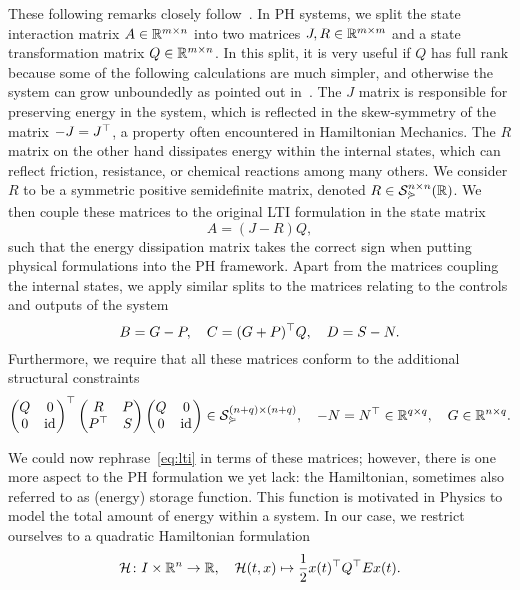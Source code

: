 These following remarks closely follow~\cite[Definition~4.9]{Mehrmann2023}.
In \ac{PH} systems, we split the state interaction matrix $A \in \mathbb{R}^{m \times n}$ into two matrices $J, R \in \mathbb{R}^{m \times m}$ and a state transformation matrix $Q \in \mathbb{R}^{m \times n}$.
In this split, it is very useful if $Q$ has full rank because some of the following calculations are much simpler, and otherwise the system can grow unboundedly as pointed out in~\cite[Remark~4.10]{Mehrmann2023}.
The $J$ matrix is responsible for preserving energy in the system, which is reflected in the skew-symmetry of the matrix $-J = J^{\top}$, a property often encountered in Hamiltonian Mechanics.
The $R$ matrix on the other hand dissipates energy within the internal states, which can reflect friction, resistance, or chemical reactions among many others.
We consider $R$ to be a symmetric positive semidefinite matrix, denoted $R \in \mathcal{S}_{\curlyeqsucc}^{n \times n}(\mathbb{R})$.
We then couple these matrices to the original \ac{LTI} formulation in the state matrix
\begin{equation*}
    A = (J - R)Q,
\end{equation*}
such that the energy dissipation matrix takes the correct sign when putting physical formulations into the \ac{PH} framework.
Apart from the matrices coupling the internal states, we apply similar splits to the matrices relating to the controls and outputs of the system
\begin{equation*}
    B = G - P,\quad C = (G + P)^{\top} Q,\quad D = S - N.
\end{equation*}
Furthermore, we require that all these matrices conform to the additional structural constraints
\begin{equation*}
    \begin{pmatrix}
        Q & 0 \\
        0 & \text{id}_{}
    \end{pmatrix}^{\top}
    \begin{pmatrix}
        R & P \\
        P^{\top} & S
    \end{pmatrix}
    \begin{pmatrix}
        Q & 0 \\
        0 & \text{id}_{}
    \end{pmatrix}
    \in \mathcal{S}_{\curlyeqsucc}^{(n + q) \times (n + q)},\quad -N = N^{\top} \in \mathbb{R}^{q \times q},\quad G \in \mathbb{R}^{n \times q}.
\end{equation*}

We could now rephrase~\eqref{eq:lti} in terms of these matrices; however, there is one more aspect to the \ac{PH} formulation we yet lack: the Hamiltonian, sometimes also referred to as (energy) storage function.
This function is motivated in Physics to model the total amount of energy within a system.
In our case, we restrict ourselves to a quadratic Hamiltonian formulation
\begin{equation}\label{eq:quadratic-hamiltonian}
    \mathcal{H} \colon I \times \mathbb{R}^{n} \to \mathbb{R},\quad \mathcal{H}(t, x) \mapsto \frac{1}{2} x(t)^{\top} Q^{\top} E x(t).
\end{equation}

